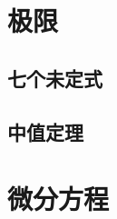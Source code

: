 \documentclass[no-math]{lecture}
\begin{document}
	\raggedbottom
	\abovedisplayshortskip=5pt
	\belowdisplayshortskip=5pt
	\abovedisplayskip=5pt
	\belowdisplayskip=5pt
	\frontmatter
		\tableofcontents
	\mainmatter
	\chapter{极限}

	\newpage
	
	\newpage

	\section{七个未定式}
	\section{中值定理}

	\chapter{微分方程}
\end{document}
